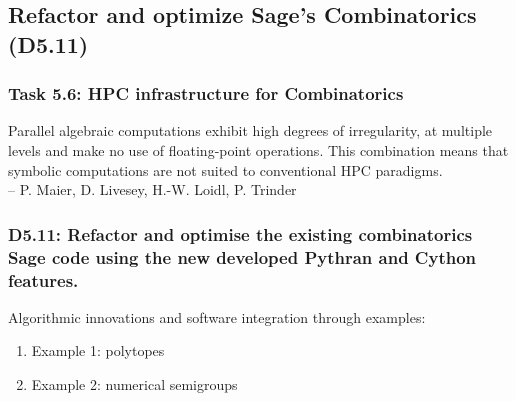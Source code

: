 \documentclass{beamer}
\begin{document}
\subsection{Refactor and optimize Sage's Combinatorics (D5.11)}
\begin{frame}
  \frametitle{Task 5.6: HPC infrastructure for Combinatorics}

  \begin{displayquote}
  \small Parallel algebraic computations exhibit high degrees of irregularity, at
  multiple levels and make no use of floating-point operations. This combination 
  means that symbolic computations are not suited to conventional HPC paradigms.
  \\ \hfill{-- P. Maier, D. Livesey, H.-W. Loidl, P. Trinder}
  \end{displayquote}


\end{frame}
\begin{frame}
  \frametitle{D5.11: Refactor and optimise the existing combinatorics Sage code using the new developed Pythran and Cython features.}

  Algorithmic innovations and software integration through examples:
  \begin{enumerate}
  \item Example 1: polytopes
  \item Example 2: numerical semigroups
  \end{enumerate}

\end{frame}
\end{document}
